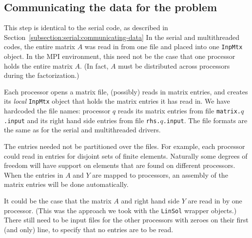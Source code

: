 \subsection{Communicating the data for the problem}
\label{subsection:MPI:communicating-data}
\par
This step is identical to the serial code, as described in
Section~\ref{subsection:serial:communicating-data}
In the serial and multithreaded codes, the entire matrix $A$ was
read in from one file and placed into one {\tt InpMtx} object.
In the MPI environment, this need not be the case that one
processor holds the entire matrix $A$.
(In fact, $A$ must be distributed across processors during the
factorization.)
\par
Each processor opens a matrix file, (possibly) reads in matrix
entries, and creates its {\it local} {\tt InpMtx} object that holds
the matrix entries it has read in.
We have hardcoded the file names: processor $q$ reads 
its matrix entries from file {\tt matrix.}$q${\tt .input}
and
its right hand side entries from file {\tt rhs.}$q${\tt .input}.
The file formats are the same as for the serial and multithreaded
drivers.
\par
The entries needed not be partitioned over the files.
For example, each processor could read in entries for disjoint sets
of finite elements.
Naturally some degrees of freedom will have support on elements
that are found on different processors.
When the entries in $A$ and $Y$ are mapped to processors, an
assembly of the matrix entries will be done automatically.
\par
It could be the case that the matrix $A$ and right hand side $Y$
are read in by one processor. (This was the approach we took with
the {\tt LinSol} wrapper objects.)
There still need to be input files for the other processors
with zeroes on their first (and only) line, 
to specify that no entries are to be read.  
\par
